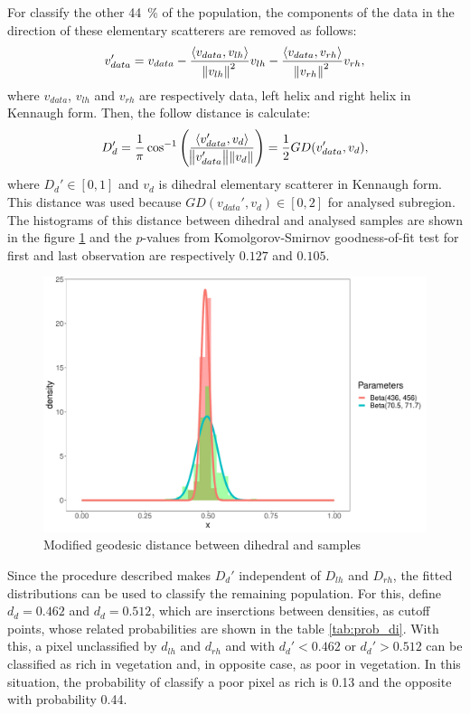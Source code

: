 \documentclass[12pt]{article}
\begin{document}
For classify the other \SI{44}{\percent} of the population, the components of the data in the direction of these elementary scatterers are removed as follows:
\begin{equation}
  v_{data}' =  v_{data} - \frac{\langle v_{data}, v_{lh} \rangle}{\norm{v_{lh}}^2} v_{lh} - \frac{\langle v_{data}, v_{rh} \rangle}{\norm{v_{rh}}^2} v_{rh},
\end{equation}
where $v_{data}$, $v_{lh}$ and $v_{rh}$ are respectively data, left helix and right helix in Kennaugh form. Then, the follow distance is calculate:
\begin{equation}
  D_{d}' = \frac{1}{\pi} \cos^{-1}\left(\frac{\langle v_{data}', v_d \rangle}{\norm{v_{data}'}\norm{v_d}}\right) = \frac{1}{2}GD(v_{data}', v_d),
\end{equation}
where $D_d' \in [0, 1]$ and $v_d$ is dihedral elementary scatterer in Kennaugh form. This distance was used because $GD(v_{data}', v_d) \in [0, 2]$ for analysed subregion. The histograms of this distance between dihedral and analysed samples are shown in the figure \ref{fig:hist_di} and the $p$-values from Komolgorov-Smirnov goodness-of-fit test for first and last observation are respectively $0.127$ and $0.105$. 
\begin{figure}[hbt]
  \centering
  \includegraphics[width = .5\linewidth]{Histograms/hist_mod_di}
  \caption{Modified geodesic distance between dihedral and samples}
  \label{fig:hist_di}
\end{figure}

Since the procedure described makes $D_d'$ independent of $D_{lh}$ and $D_{rh}$, the fitted distributions can be used to classify the remaining population. For this, 
define $d_d = 0.462$ and $d_d = 0.512$, which are inserctions between densities, as cutoff points, whose related probabilities are shown in the table \ref{tab:prob_di}.
With this, a pixel unclassified by $d_{lh}$ and $d_{rh}$ and with $d_d' < 0.462$ or $d_d' > 0.512$ can be classified as rich in vegetation and, in opposite case, as poor in vegetation. In this situation, the probability of classify a poor pixel as rich is 0.13 and the opposite with probability 0.44. 
\end{document}
